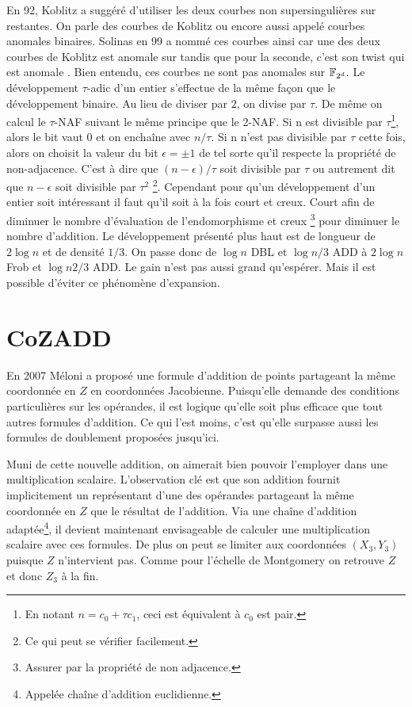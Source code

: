 \documentclass[a4paper]{report}
\begin{document}
En 92, Koblitz a suggéré d'utiliser les deux courbes non supersingulières sur  restantes. On parle des courbes de Koblitz ou encore aussi appelé courbes anomales binaires. Solinas en 99 a nommé ces courbes ainsi car une des deux courbes de Koblitz est anomale sur  tandis que pour la seconde, c'est son twist qui est anomale . Bien entendu, ces courbes ne sont pas anomales sur $\mathbb{F}_{2^d}$. Le développement $\tau$-adic d'un entier s'effectue de la même façon que le développement binaire. Au lieu de diviser par $2$, on divise par $\tau$. De même on calcul le $\tau$-NAF suivant le même principe que le 2-NAF. Si n est divisible par $\tau$\footnote{En notant $n = c_0 + \tau c_1$, ceci est équivalent à $c_0$ est pair.}, alors le bit vaut 0 et on enchaîne avec $n/\tau$. Si n n'est pas divisible par $\tau$ cette fois, alors on choisit la valeur du bit $\epsilon = \pm 1$ de tel sorte qu'il respecte la propriété de non-adjacence. C'est à dire que $(n - \epsilon)/\tau$ soit divisible par $\tau$ ou autrement dit que $n - \epsilon$ soit divisible par $\tau^2$ \footnote{Ce qui peut se vérifier facilement.}. 
Cependant pour qu'un développement d'un entier soit intéressant il faut qu'il soit à la fois court et creux. Court afin de diminuer le nombre d'évaluation de l'endomorphisme et creux \footnote{Assurer par la propriété de non adjacence.} pour diminuer le nombre d'addition. Le développement présenté plus haut est de longueur de $2\log{n}$ et de densité $1/3$. On passe donc de $\log{n}$ DBL et $\log{n}/3$ ADD à $2\log{n}$ Frob et $\log{n}2/3$ ADD. Le gain n'est pas aussi grand qu'espérer. Mais il est possible d'éviter ce phénomène d'expansion. 

\section{CoZADD}
En 2007 Méloni a proposé une formule d'addition de points partageant la même coordonnée en $Z$ en coordonnées Jacobienne. Puisqu'elle demande des conditions particulières sur les opérandes, il est logique qu'elle soit plus efficace que tout autres formules d'addition. Ce qui l'est moins, c'est qu'elle surpasse aussi les formules de doublement proposées jusqu'ici.

Muni de cette nouvelle addition, on aimerait bien pouvoir l'employer dans une multiplication scalaire. L'observation clé est que son addition fournit implicitement un représentant d'une des opérandes partageant la même coordonnée en $Z$ que le résultat de l'addition. Via une chaîne d'addition adaptée\footnote{Appelée chaîne d'addition euclidienne.}, il devient maintenant envisageable de calculer une multiplication scalaire avec ces formules. De plus on peut se limiter aux coordonnées $(X_3, Y_3)$ puisque $Z$ n'intervient pas. Comme pour l'échelle de Montgomery on retrouve $Z$ et donc $Z_3$ à la fin.
\end{document}
